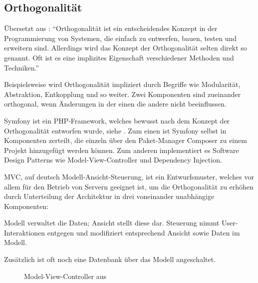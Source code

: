 \subsection{Orthogonalität}

Übersetzt aus \cite[Seite 92]{thomas2019pragmatic}: "`Orthogonalität ist ein entscheidendes Konzept in der Programmierung von Systemen, die einfach zu entwerfen, bauen, testen und erweitern sind. Allerdings wird das Konzept der Orthogonalität selten direkt so genannt. Oft ist es eine implizites Eigenschaft verschiedener Methoden und Techniken."'

Beispielsweise wird Orthogonalität impliziert durch Begriffe wie Modularität, Abstraktion, Entkopplung und so weiter. Zwei Komponenten sind zueinander orthogonal, wenn Änderungen in der einen die andere nicht beeinflussen. 

Symfony ist ein PHP-Framework, welches bewusst nach dem Konzept der Orthogonalität entworfen wurde, siehe \cite{potencier2022symfony}. Zum einen ist Symfony selbst in Komponenten zerteilt, die einzeln über den Paket-Manager Composer \cite{composer} zu einem Projekt hinzugefügt werden können. Zum anderen implementiert es Software Design Patterns wie Model-View-Controller und Dependency Injection.


MVC, auf deutsch Modell-Ansicht-Steuerung, ist ein Entwurfsmuster, welches vor allem für den Betrieb von Servern geeignet ist, um die Orthogonalität zu erhöhen durch Unterteilung der Architektur in drei voneinander unabhängige Komponenten:

Modell verwaltet die Daten; Ansicht stellt diese dar. Steuerung nimmt User-Interaktionen entgegen und modifiziert entsprechend Ansicht sowie Daten im Modell.

Zusätzlich ist oft noch eine Datenbank über das Modell angeschaltet. 

\begin{figure}[H]
    \centering
    \setlength{\fboxsep}{12pt}\color{black!20}
    \normalcolor\vspace{-0.2em}\caption{Model-View-Controller aus \cite[Seite 177]{voorhees2020guide}}
\end{figure}

